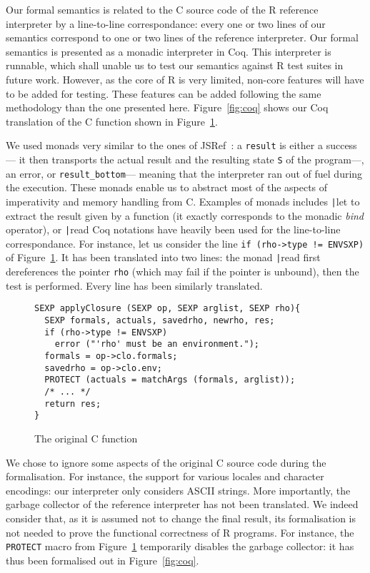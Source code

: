 \documentclass[9pt, sigplan, natbib=false, screen=true]{acmart}
\newcommand\Coq{Coq}
\newcommand\R{R}
\newcommand\Cn{C}
\begin{document}
Our formal semantics is related to the \Cn{} source code
of the \R{} reference interpreter
by a line-to-line correspondance:
every one or two lines of our semantics
correspond to one or two lines of the reference interpreter.
Our formal semantics is presented as a monadic interpreter in \Coq{}.
This interpreter is runnable,
which shall unable us to test our semantics against
\R{} test suites in future work.
However, as the core of \R{} is very limited,
non-core features will have to be added for testing.
These features can be added following the same methodology than the one presented here.
Figure~\ref{fig:coq} shows our \Coq{} translation
of the \Cn{} function shown in Figure~\ref{fig:c}.

We used monads very similar to the ones of JSRef~\parencite{popl14jscert}:
a \texttt{result} is either a success---%
it then transports the actual result and the resulting state
\texttt{S} of the program---,
an error, or \texttt{result_bottom}---%
meaning that the interpreter ran out of fuel during the execution.
These monads enable us to abstract most of the aspects
of imperativity and memory handling from \Cn{}.
Examples of monads includes
\texttt|let%
to extract the result given by a function
(it exactly corresponds to the monadic \emph{bind} operator),
or \texttt|read%
\Coq{} notations have heavily been used
for the line-to-line correspondance.
For instance, let us consider
the line \texttt{if (rho->type != ENVSXP)}
of Figure~\ref{fig:c}.
It has been translated into two lines:
the monad \texttt|read%
first dereferences the pointer \texttt{rho}
(which may fail if the pointer is unbound),
then the test is performed.
Every line has been similarly translated.

\begin{figure}
\begin{verbatim}
SEXP applyClosure (SEXP op, SEXP arglist, SEXP rho){
  SEXP formals, actuals, savedrho, newrho, res;
  if (rho->type != ENVSXP)
    error ("'rho' must be an environment.");
  formals = op->clo.formals;
  savedrho = op->clo.env;
  PROTECT (actuals = matchArgs (formals, arglist));
  /* ... */
  return res;
}
\end{verbatim}
    \caption{The original \Cn{} function}
    \label{fig:c}
\end{figure}

We chose to ignore some aspects of the original \Cn{} source code
during the formalisation.
For instance, the support for various locales and character encodings:
our interpreter only considers ASCII strings.
More importantly, the garbage collector of the reference interpreter
has not been translated.
We indeed consider that, as it is assumed not to change the final result,
its formalisation is not needed to prove the functional correctness
of \R{} programs.
For instance,
the \texttt{PROTECT} macro from Figure~\ref{fig:c}
temporarily disables the garbage collector:
it has thus been formalised out in Figure~\ref{fig:coq}.
\end{document}
